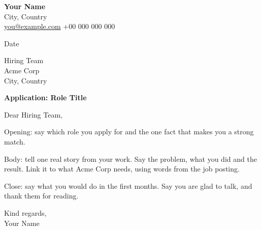 \documentclass[11pt,a4paper]{article}
\begin{document}
\textbf{Your Name}\\
City, Country\\
\href{mailto:you@example.com}{you@example.com} \quad +00 000 000 000

\vspace{1em}
Date

Hiring Team\\
Acme Corp\\
City, Country

\textbf{Application: Role Title}

Dear Hiring Team,

Opening: say which role you apply for and the one fact that makes you a strong match.

Body: tell one real story from your work. Say the problem, what you did and the result. Link it to what Acme Corp needs, using words from the job posting.

Close: say what you would do in the first months. Say you are glad to talk, and thank them for reading.

Kind regards,\\
Your Name
\end{document}

